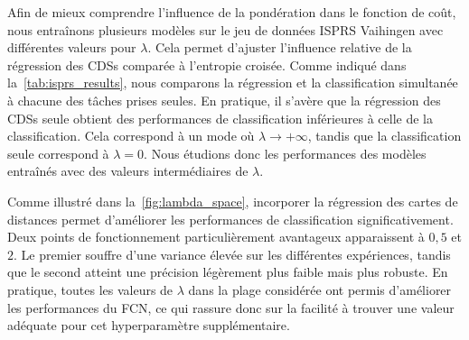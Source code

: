 Afin de mieux comprendre l'influence de la pondération dans le fonction de coût, nous entraînons plusieurs modèles sur le jeu de données \gls{ISPRS} Vaihingen avec différentes valeurs pour $\lambda$. Cela permet d'ajuster l'influence relative de la régression des \glspl{CDS} comparée à l'entropie croisée. Comme indiqué dans la~\cref{tab:isprs_results}, nous comparons la régression et la classification simultanée à chacune des tâches prises seules. En pratique, il s'avère que la régression des \glspl{CDS} seule obtient des performances de classification inférieures à celle de la classification. Cela correspond à un mode où $\lambda \rightarrow +\infty$, tandis que la classification seule correspond à $\lambda = 0$. Nous étudions donc les performances des modèles entraînés avec des valeurs intermédiaires de $\lambda$.

Comme illustré dans la~\cref{fig:lambda_space}, incorporer la régression des cartes de distances permet d'améliorer les performances de classification significativement. Deux points de fonctionnement particulièrement avantageux apparaissent à $0,5$ et $2$. Le premier souffre d'une variance élevée sur les différentes expériences, tandis que le second atteint une précision légèrement plus faible mais plus robuste. En pratique, toutes les valeurs de $\lambda$ dans la plage considérée ont permis d'améliorer les performances du \gls{FCN}, ce qui rassure donc sur la facilité à trouver une valeur adéquate pour cet hyperparamètre supplémentaire.



